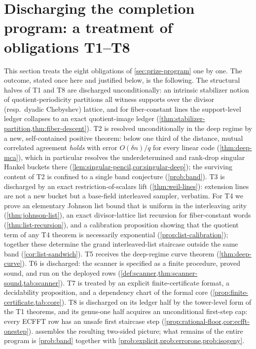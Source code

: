 \documentclass[11pt]{article}
\theoremstyle{definition}
\theoremstyle{remark}
\begin{document}
\section{Discharging the completion program: a treatment of obligations T1--T8}\label{sec:discharge}

This section treats the eight obligations of \cref{sec:prize-program} one by one. The outcome, stated once here and justified below, is the following. The structural halves of T1 and T8 are discharged unconditionally: an intrinsic stabilizer notion of quotient-periodicity partitions all witness supports over the divisor (resp.\ dyadic Chebyshev) lattice, and for fiber-constant lines the support-level ledger collapses to an exact quotient-image ledger (\cref{thm:stabilizer-partition,thm:fiber-descent}). T2 is resolved unconditionally in the deep regime by a new, self-contained positive theorem: below one third of the distance, mutual correlated agreement \emph{holds} with error $O(\delta n)/q$ for every linear code (\cref{thm:deep-mca}), which in particular resolves the underdetermined and rank-drop singular Hankel buckets there (\cref{lem:singular-pencil,cor:singular-deep}); the surviving content of T2 is confined to a single band conjecture (\cref{prob:band}). T3 is discharged by an exact restriction-of-scalars lift (\cref{thm:weil-lines}): extension lines are not a new bucket but a base-field interleaved sampler, verbatim. For T4 we prove an elementary Johnson list bound that is uniform in the interleaving arity (\cref{thm:johnson-list}), an exact divisor-lattice list recursion for fiber-constant words (\cref{thm:list-recursion}), and a calibration proposition showing that the quotient term of any T4 theorem is necessarily exponential (\cref{prop:list-calibration}); together these determine the grand interleaved-list staircase outside the same band (\cref{cor:list-sandwich}). T5 receives the deep-regime curve theorem (\cref{thm:deep-curve}). T6 is discharged: the scanner is specified as a finite procedure, proved sound, and run on the deployed rows (\cref{def:scanner,thm:scanner-sound,tab:scanner}). T7 is treated by an explicit finite-certificate format, a decidability proposition, and a dependency chart of the formal core (\cref{prop:finite-certificate,tab:core}). T8 is discharged on its ledger half by the tower-level form of the T1 theorems, and its genus-one half acquires an unconditional first-step cap: every ECFFT row has an unsafe first staircase step (\cref{prop:rational-floor,cor:ecfft-onestep}).  assembles the resulting two-sided picture; what remains of the entire program is \cref{prob:band} together with \cref{prob:explicit,prob:errorone,prob:isogeny}.
\end{document}
